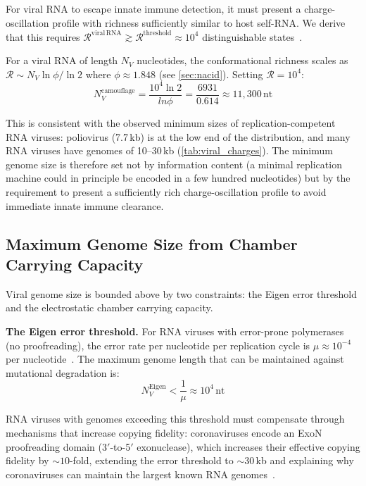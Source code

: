 \documentclass[12pt,a4paper]{article}
\theoremstyle{definition}
\theoremstyle{remark}
\newcommand{\Rcat}{\mathcal{R}}
\begin{document}
For viral RNA to escape innate immune detection, it must present a charge-oscillation profile with richness sufficiently similar to host self-RNA. We derive that this requires $\Rcat^{\mathrm{viral\,RNA}} \gtrsim \Rcat^{\mathrm{threshold}} \approx 10^4$ distinguishable states~\cite{Pichlmair2006}.

For a viral RNA of length $N_V$ nucleotides, the conformational richness scales as $\Rcat \sim N_V \ln\phi / \ln 2$ where $\phi \approx 1.848$ (see \cref{sec:nacid}). Setting $\Rcat = 10^4$:
\begin{equation}
  N_V^{\mathrm{camouflage}} = \frac{10^4 \ln 2}{ln\phi} = \frac{6931}{0.614} \approx 11,300\,\mathrm{nt}
  \label{eq:Ncamouflage}
\end{equation}

This is consistent with the observed minimum sizes of replication-competent RNA viruses: poliovirus (7.7\,kb) is at the low end of the distribution, and many RNA viruses have genomes of 10--30\,kb (\cref{tab:viral_charges}). The minimum genome size is therefore set not by information content (a minimal replication machine could in principle be encoded in a few hundred nucleotides) but by the requirement to present a sufficiently rich charge-oscillation profile to avoid immediate innate immune clearance.

\subsection{Maximum Genome Size from Chamber Carrying Capacity}

Viral genome size is bounded above by two constraints: the Eigen error threshold and the electrostatic chamber carrying capacity.

\textbf{The Eigen error threshold.}
For RNA viruses with error-prone polymerases (no proofreading), the error rate per nucleotide per replication cycle is $\mu \approx 10^{-4}$ per nucleotide~\cite{Drake1998,Eigen1971}. The maximum genome length that can be maintained against mutational degradation is:
\begin{equation}
  N_V^{\mathrm{Eigen}} < \frac{1}{\mu} \approx 10^4\,\mathrm{nt}
  \label{eq:eigen_threshold}
\end{equation}

RNA viruses with genomes exceeding this threshold must compensate through mechanisms that increase copying fidelity: coronaviruses encode an ExoN proofreading domain (3$'$-to-5$'$ exonuclease), which increases their effective copying fidelity by $\sim\!10$-fold, extending the error threshold to $\sim\!30$\,kb and explaining why coronaviruses can maintain the largest known RNA genomes~\cite{Denison2011,Eckerle2010}.
\end{document}

